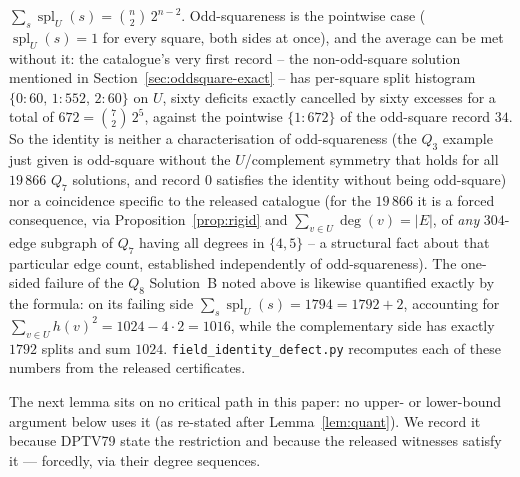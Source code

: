 \documentclass[12pt]{article}
\begin{document}
$\sum_s\operatorname{spl}_U(s)=\binom n2\,2^{n-2}$. Odd-squareness is
the pointwise case ($\operatorname{spl}_U(s)=1$ for every square, both
sides at once), and the average can be met without it: the catalogue's
very first record -- the non-odd-square solution mentioned in
Section~\ref{sec:oddsquare-exact} -- has per-square split histogram
$\{0{:}60,\,1{:}552,\,2{:}60\}$ on $U$, sixty deficits exactly
cancelled by sixty excesses for a total of $672=\binom72\,2^{5}$,
against the pointwise $\{1{:}672\}$ of the odd-square record $34$. So
the identity is neither a characterisation of odd-squareness (the $Q_3$
example just given is odd-square without the $U$/complement symmetry that
holds for all $19\,866$ $Q_7$ solutions, and record $0$ satisfies the
identity without being odd-square) nor a coincidence specific to the
released catalogue (for the $19\,866$ it is a forced consequence, via
Proposition~\ref{prop:rigid} and $\sum_{v\in U}\deg(v)=|E|$, of
\emph{any} $304$-edge subgraph of $Q_7$ having all degrees in $\{4,5\}$
-- a structural fact about that particular edge count, established
independently of odd-squareness). The one-sided failure of the $Q_8$
Solution~B noted above is likewise quantified exactly by the formula: on
its failing side $\sum_s\operatorname{spl}_U(s)=1794=1792+2$, accounting
for $\sum_{v\in U}h(v)^2=1024-4\cdot2=1016$, while the complementary
side has exactly $1792$ splits and sum $1024$.
\texttt{field\_identity\_defect.py} recomputes each of these numbers
from the released certificates.

The next lemma sits on no critical path in this paper: no upper- or
lower-bound argument below uses it (as re-stated after
Lemma~\ref{lem:quant}). We record it because DPTV79 state the
restriction and because the released witnesses satisfy it --- forcedly,
via their degree sequences.
\end{document}
